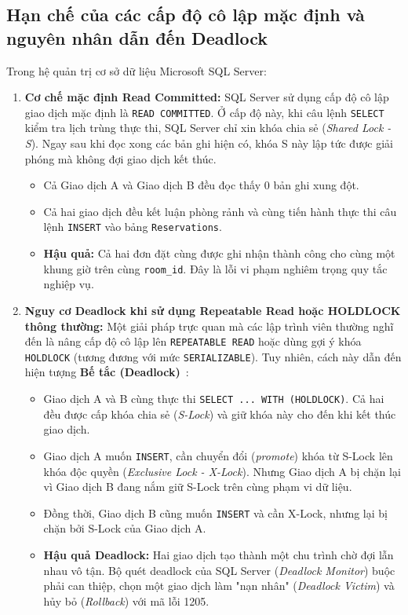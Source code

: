 \subsection{Hạn chế của các cấp độ cô lập mặc định và nguyên nhân dẫn đến Deadlock}
Trong hệ quản trị cơ sở dữ liệu Microsoft SQL Server:
\begin{enumerate}[leftmargin=2em]
    \item \textbf{Cơ chế mặc định Read Committed:}
    SQL Server sử dụng cấp độ cô lập giao dịch mặc định là \texttt{READ COMMITTED}. Ở cấp độ này, khi câu lệnh \texttt{SELECT} kiểm tra lịch trùng thực thi, SQL Server chỉ xin khóa chia sẻ (\textit{Shared Lock - S}). Ngay sau khi đọc xong các bản ghi hiện có, khóa S này lập tức được giải phóng mà không đợi giao dịch kết thúc.
    \begin{itemize}
        \item Cả Giao dịch A và Giao dịch B đều đọc thấy 0 bản ghi xung đột.
        \item Cả hai giao dịch đều kết luận phòng rảnh và cùng tiến hành thực thi câu lệnh \texttt{INSERT} vào bảng \texttt{Reservations}.
        \item \textbf{Hậu quả:} Cả hai đơn đặt cùng được ghi nhận thành công cho cùng một khung giờ trên cùng \texttt{room\_id}. Đây là lỗi vi phạm nghiêm trọng quy tắc nghiệp vụ.
    \end{itemize}

    \item \textbf{Nguy cơ Deadlock khi sử dụng Repeatable Read hoặc HOLDLOCK thông thường:}
    Một giải pháp trực quan mà các lập trình viên thường nghĩ đến là nâng cấp độ cô lập lên \texttt{REPEATABLE READ} hoặc dùng gợi ý khóa \texttt{HOLDLOCK} (tương đương với mức \texttt{SERIALIZABLE}). Tuy nhiên, cách này dẫn đến hiện tượng \textbf{Bế tắc (Deadlock)}~\cite{habibi2024towards, zhang2023adaptive}:
    \begin{itemize}
        \item Giao dịch A và B cùng thực thi \texttt{SELECT ... WITH (HOLDLOCK)}. Cả hai đều được cấp khóa chia sẻ (\textit{S-Lock}) và giữ khóa này cho đến khi kết thúc giao dịch.
        \item Giao dịch A muốn \texttt{INSERT}, cần chuyển đổi (\textit{promote}) khóa từ S-Lock lên khóa độc quyền (\textit{Exclusive Lock - X-Lock}). Nhưng Giao dịch A bị chặn lại vì Giao dịch B đang nắm giữ S-Lock trên cùng phạm vi dữ liệu.
        \item Đồng thời, Giao dịch B cũng muốn \texttt{INSERT} và cần X-Lock, nhưng lại bị chặn bởi S-Lock của Giao dịch A.
        \item \textbf{Hậu quả Deadlock:} Hai giao dịch tạo thành một chu trình chờ đợi lẫn nhau vô tận. Bộ quét deadlock của SQL Server (\textit{Deadlock Monitor}) buộc phải can thiệp, chọn một giao dịch làm "nạn nhân" (\textit{Deadlock Victim}) và hủy bỏ (\textit{Rollback}) với mã lỗi 1205.
    \end{itemize}
\end{enumerate}

